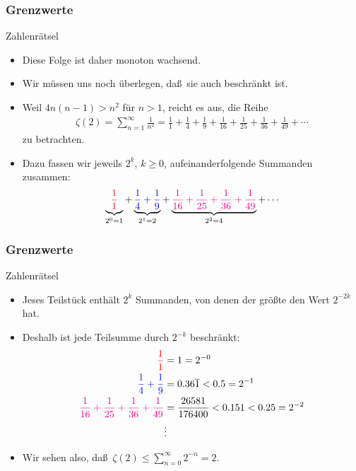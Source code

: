 \documentclass{beamer}
\renewcommand{\ae}{\"a}
\renewcommand{\oe}{\"o}
\newcommand{\ue}{\"u}
\newcommand{\mytitle}{Grenzwerte}
\begin{document}
\begin{frame}\frametitle{\mytitle}
	\begin{block}{Zahlenr\ae tsel}
		\begin{itemize}
			\item Diese Folge ist daher monoton wachsend.
			\item Wir m\ue ssen uns noch \ue berlegen, da\ss\ sie auch beschr\ae nkt ist.
			\item Weil $4n(n-1)>n^2$ f\ue r $n>1$, reicht es aus, die Reihe
				\begin{align*}
					\zeta(2)=\sum_{n=1}^\infty\frac{1}{n^2}=\frac{1}{1}+\frac{1}{4}+\frac{1}{9}+\frac{1}{16}+\frac{1}{25}+\frac{1}{36}+\frac{1}{49}+\cdots
				\end{align*}
				zu betrachten.
			\item Dazu fassen wir jeweils $2^k$, $k\geq0$, aufeinanderfolgende Summanden zusammen:
				\begin{align*}
					\underbrace{\textcolor{red}{\frac{1}{1}}}_{2^0=1}+\underbrace{\textcolor{blue}{\frac{1}{4}+\frac{1}{9}}}_{2^1=2}+\underbrace{\textcolor{magenta}{\frac{1}{16}+\frac{1}{25}+\frac{1}{36}+\frac{1}{49}}}_{2^2=4}+\cdots
				\end{align*}
		\end{itemize}
	\end{block}
\end{frame}

\begin{frame}\frametitle{\mytitle}
	\begin{block}{Zahlenr\ae tsel}
		\begin{itemize}
			\item Jeses Teilst\ue ck enth\ae lt $2^k$ Summanden, von denen der gr\oe\ss te den Wert $2^{-2k}$ hat.
			\item Deshalb ist jede Teilsumme durch $2^{-k}$ beschr\ae nkt:
				\begin{align*}
					\textcolor{red}{\frac{1}{1}}&=1=2^{-0}\\
					\textcolor{blue}{\frac{1}{4}+\frac{1}{9}}&=0.36\overline 1<0.5=2^{-1}\\
					\textcolor{magenta}{\frac{1}{16}+\frac{1}{25}+\frac{1}{36}+\frac{1}{49}}&=\frac{26581}{176400}<0.151<0.25=2^{-2}\\
																							&\vdots
				\end{align*}
			\item Wir sehen also, da\ss\ $\displaystyle \zeta(2)\leq\sum_{n=0}^\infty2^{-n}=2.$
		\end{itemize}
	\end{block}
\end{frame}
\end{document}
